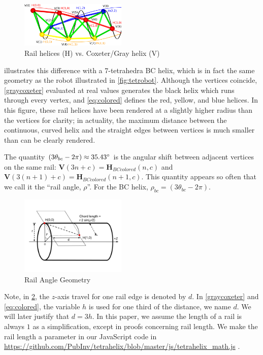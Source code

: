 \documentclass[twocolumn,10pt]{asme2ej}
\renewcommand{\vec}[1]{\mathbf{#1}}
\begin{document}
\begin{figure}
  \centering
     \includegraphics[width=0.45\textwidth]{figures/Unified.png}
     \caption{Rail helices (H) vs. Coxeter/Gray helix (V) }
  \label{fig:helixcomparison}  
\end{figure}

 illustrates this difference with a 7-tetrahedra BC helix, which is
in fact the same geometry as the robot illustrated in \cref{fig:tetrobot}.
Although the vertices coincide,
 \cref{graycoxeter} evaluated
at real values generates the black helix which runs through every vertex, and \cref{eq:colored} defines
the red, yellow, and blue helices. In this figure,
these rail helices have been rendered at a slightly higher radius than the vertices for clarity;
in actuality, the maximum distance between the continuous, curved helix and the
straight edges between vertices is much smaller than can be clearly rendered.

The quantity $ (3 \theta_{bc} - 2 \pi) \approx 35.43 \degree $  is the angular shift between
adjacent vertices on the same rail:
$ \vec{V}(3n + c)= \vec{H}_{BCcolored}(n,c)$ and
$ \vec{V}(3(n+1)+c)= \vec{H}_{BCcolored}(n+1,c)$.
This quantity appears so often that we call it the ``rail angle, $\rho$''. For the BC helix, $\rho_{bc} = (3 \theta_{bc} - 2 \pi)$.

\begin{figure}
     \centering
     \includegraphics[width=0.45\textwidth]{figures/RailAngleGeometry.png}
     \caption{Rail Angle Geometry}
  \label{railanglefig}
\end{figure}

Note, in \cref{railanglefig}, the $z$-axis travel for one rail edge is denoted by $d$. In \cref{graycoxeter} and  \cref{eq:colored}, the variable
$h$ is used for one third of the distance, we name $d$. We will later justify that $d = 3h$.
In this paper, we assume the length of a rail
is always $1$ as a simplification, except in proofs concerning rail length.
We make the rail length a parameter in our JavaScript code in
\url{https://github.com/PubInv/tetrahelix/blob/master/js/tetrahelix_math.js} \cite{readtetrahelix}.
\end{document}
